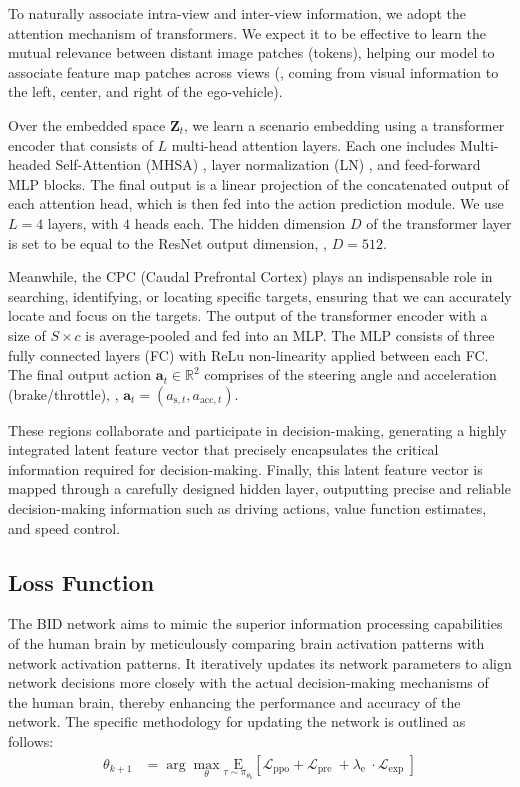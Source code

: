 To naturally associate intra-view and inter-view information, we adopt the attention mechanism of transformers\cite{Vaswani:2017}. 
We expect it to be effective to learn the mutual relevance between distant image patches (tokens), helping our model to associate feature map patches across views ({\ie}, coming from visual information to the left, center, and right of the ego-vehicle). 


Over the embedded space $\mathbf{Z}_{t}$, we learn a scenario embedding using a transformer encoder that consists of $L$ multi-head attention layers. 
Each one includes Multi-headed Self-Attention (MHSA) \cite{Vaswani:2017}, layer normalization (LN) \cite{Ba:2016}, and feed-forward MLP blocks.  
The final output is a linear projection of the concatenated output of each attention head, which is then fed into the action prediction module. We use $L=4$ layers, with $4$ heads each. 
The hidden dimension $D$ of the transformer layer is set to be equal to the ResNet output dimension, {\ie}, $D=512$. 


Meanwhile, the CPC (Caudal Prefrontal Cortex) plays an indispensable role in searching, identifying, or locating specific targets, ensuring that we can accurately locate and focus on the targets. 
The output of the transformer encoder with a size of $S\times c$ is average-pooled and fed into an MLP. 
The MLP consists of three fully connected layers (FC) with ReLu non-linearity applied between each FC. 
The final output action $\mathbf{a}_t\in\mathbb{R}^2$ comprises of the steering angle and acceleration (brake/throttle), {\ie}, $\mathbf{a}_{t} = (a_{\text{s},t}, a_{\text{acc}, t})$. 


These regions collaborate and participate in decision-making, generating a highly integrated latent feature vector that precisely encapsulates the critical information required for decision-making. 
Finally, this latent feature vector is mapped through a carefully designed hidden layer, outputting precise and reliable decision-making information such as driving actions, value function estimates, and speed control.


\subsection{Loss Function}
The BID network aims to mimic the superior information processing capabilities of the human brain by meticulously comparing brain activation patterns with network activation patterns. 
It iteratively updates its network parameters to align network decisions more closely with the actual decision-making mechanisms of the human brain, thereby enhancing the performance and accuracy of the network. 
The specific methodology for updating the network is outlined as follows:
\begin{align}
	\theta_{k+1} & = \arg \max _{\theta} \underset{\tau \sim \pi_{\theta_{k}}}{\mathrm{E}}\left[\mathcal{L}_{\mathrm{ppo}}+\mathcal{L}_{\text {pre }}+\lambda_{\text {e }} \cdot \mathcal{L}_{\text {exp }}\right]
\end{align}


